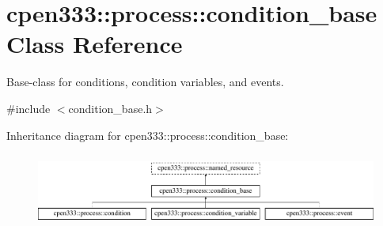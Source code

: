 \hypertarget{classcpen333_1_1process_1_1condition__base}{}\section{cpen333\+:\+:process\+:\+:condition\+\_\+base Class Reference}
\label{classcpen333_1_1process_1_1condition__base}


Base-\/class for conditions, condition variables, and events.  




{\ttfamily \#include $<$condition\+\_\+base.\+h$>$}

Inheritance diagram for cpen333\+:\+:process\+:\+:condition\+\_\+base\+:\begin{figure}[H]
\begin{center}
\leavevmode
\includegraphics[height=2.434783cm]{classcpen333_1_1process_1_1condition__base}
\end{center}
\end{figure}
